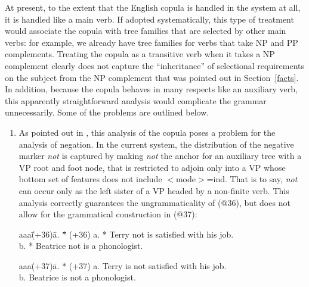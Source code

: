 \label{main}
At present, to the extent that the English copula is handled in the
system at all, it is handled like a main verb. If adopted
systematically, this type of treatment would associate the copula with
tree families that are selected by other main verbs: for example, we
already have tree families for verbs that take NP and PP complements.
Treating the copula as a transitive verb when it takes a NP complement
clearly does not capture the ``inheritance'' of selectional requirements
on the subject from the NP complement that was pointed out in
Section~\ref{facts}. In addition, because the copula behaves in many
respects like an auxiliary verb, this apparently straightforward
analysis would complicate the grammar unnecessarily.  Some of the
problems are outlined below.
\begin{enumerate}

\item As pointed out in \cite{za89}, this analysis of the copula poses a
problem for the analysis of negation. In the current system, the
distribution of the negative marker {\em not} is captured by making {\em
not} the anchor for an auxiliary tree with a VP root and foot node, that
is restricted to adjoin only into a VP whose bottom set of features does
not include $<$mode$>$=ind.  That is to say, {\em not} can occur only as the
left sister of a VP headed by a non-finite verb.  This analysis
correctly guarantees the ungrammaticality of (@36), but does not allow
for the grammatical construction in (@37):
\begin{tabbing}
aaa\=(+36)\= a. \= *\= \kill
   \>(+36)\> a. \> *\> Terry not is satisfied with his job. \\
   \>    \> b. \>  *\> Beatrice not is a phonologist.
\end{tabbing}
\begin{tabbing}
aaa\=(+37)\= a. \= *\= \kill
   \>(+37)\> a. \>  \> Terry is not satisfied with his job. \\
   \>    \> b. \>   \> Beatrice is not a phonologist.
\end{tabbing}


\end{enumerate}
